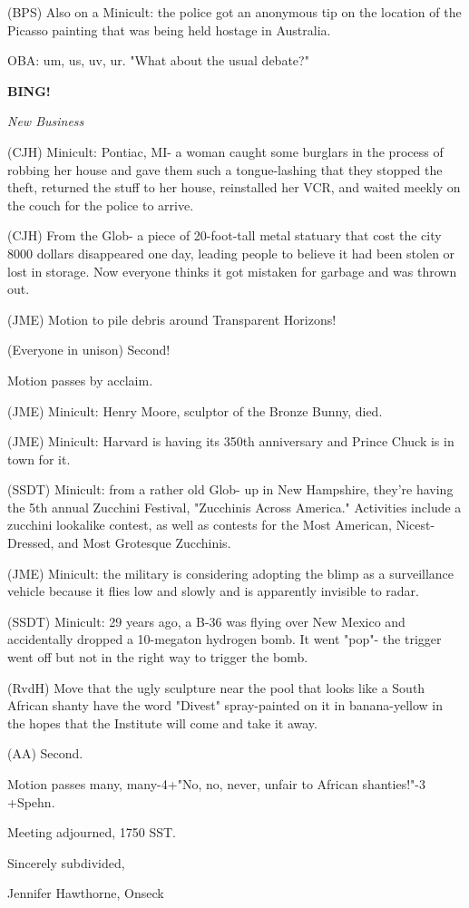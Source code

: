 \documentclass[12pt]{article}
\newcommand{\bing}{{\bf BING!} }
\newcommand{\goto}[1]{\bing \vskip 12pt \centerline{{\em{#1}}}}
\begin{document}
(BPS) Also on a Minicult: the police got an anonymous tip on the location of the Picasso painting that was being held hostage in Australia.

OBA: um, us, uv, ur. "What about the usual debate?"

\goto{New Business}

(CJH) Minicult: Pontiac, MI- a woman caught some burglars in the process of robbing her house and gave them such a tongue-lashing that they stopped the theft, returned the stuff to her house, reinstalled her VCR, and waited meekly on the couch for the police to arrive.

(CJH) From the Glob- a piece of 20-foot-tall metal statuary that cost the city 8000 dollars disappeared one day, leading people to believe it had been stolen or lost in storage. Now everyone thinks it got mistaken for garbage and was thrown out.

(JME) Motion to pile debris around Transparent Horizons!

(Everyone in unison) Second!

Motion passes by acclaim.

(JME) Minicult: Henry Moore, sculptor of the Bronze Bunny, died.

(JME) Minicult: Harvard is having its 350th anniversary and Prince Chuck is in town for it.

(SSDT) Minicult: from a rather old Glob- up in New Hampshire, they're having the 5th annual Zucchini Festival, "Zucchinis Across America." Activities include a zucchini lookalike contest, as well as contests for the Most American, Nicest-Dressed, and Most Grotesque Zucchinis.

(JME) Minicult: the military is considering adopting the blimp as a surveillance vehicle because it flies low and slowly and is apparently invisible to radar.

(SSDT) Minicult: 29 years ago, a B-36 was flying over New Mexico and accidentally dropped a 10-megaton hydrogen bomb. It went "pop"- the trigger went off but not in the right way to trigger the bomb.

(RvdH) Move that the ugly sculpture near the pool that looks like a South African shanty have the word "Divest" spray-painted on it in banana-yellow in the hopes that the Institute will come and take it away.

(AA) Second.

Motion passes many, many-4+"No, no, never, unfair to African shanties!"-3 +Spehn.

\vspace{12pt}

\noindent
Meeting adjourned, 1750 SST.

\vspace{18pt}

\centerline{Sincerely subdivided,}
\centerline{Jennifer Hawthorne, Onseck}
\end{document}
